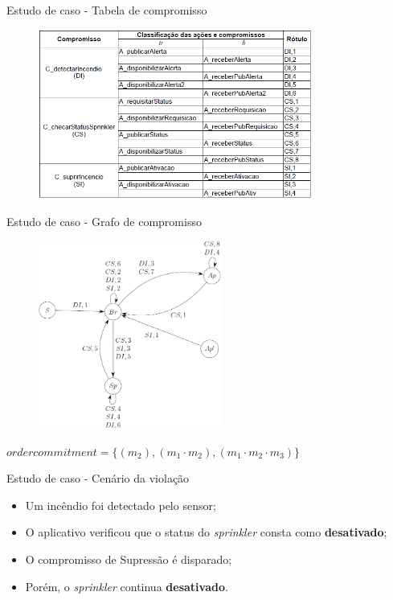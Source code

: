 \documentclass[12pt,xcolor={usenames,dvipsnames}]{beamer}
\begin{document}
\begin{frame}{Estudo de caso - Tabela de compromisso}
\begin{figure}[ht]
	\centering
	\includegraphics[width=9cm]{./figuras/tabela_estudo.png}
\end{figure} 
\end{frame}

\begin{frame}{Estudo de caso - Grafo de compromisso}
\begin{figure}[ht]
	\centering
	\includegraphics[width=6cm]{./figuras/estudo_grafo.png}
\end{figure} 
$ordercommitment = \{ (m_{2}), (m_{1} \cdot m_{2}), (m_{1} \cdot m_{2} \cdot m_{3}) \}$
\end{frame}

\begin{frame}{Estudo de caso - Cenário da violação}
	\begin{itemize}
		\item Um incêndio foi detectado pelo sensor;
		\item O aplicativo verificou que o status do \textit{sprinkler} consta como  \textbf{desativado};
		\item O compromisso de Supressão é disparado;
		\item Porém, o \textit{sprinkler} continua \textbf{desativado}.
	\end{itemize}
\end{frame}
\end{document}
